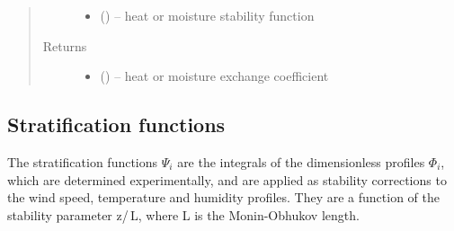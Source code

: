 \documentclass[letterpaper,10pt,english]{sphinxmanual}
\begin{document}
\begin{fulllineitems}
\begin{quote}
\begin{description}
\begin{itemize}
\item {} 
 (\href{https://docs.python.org/3/library/functions.html\#float}{}) -- heat or moisture stability function
\end{itemize}

\item[{Returns}] \leavevmode
\begin{itemize}
\item {} 
 (\href{https://docs.python.org/3/library/functions.html\#float}{}) -- heat  or moisture exchange coefficient
\end{itemize}


\end{description}\end{quote}

\end{fulllineitems}
%
%
\subsection{Stratification functions}
\label{\detokenize{index:stratification-functions}}
The stratification functions $\Psi_{i}$ are the integrals of the dimensionless profiles $\Phi_{i}$, which are determined experimentally, and are applied as stability corrections to the wind speed, temperature and humidity profiles. They are a function of the stability parameter z\slash\,L, where L is the Monin-Obhukov length.


\label{\detokenize{index:module-flux_subs}}

\end{document}
